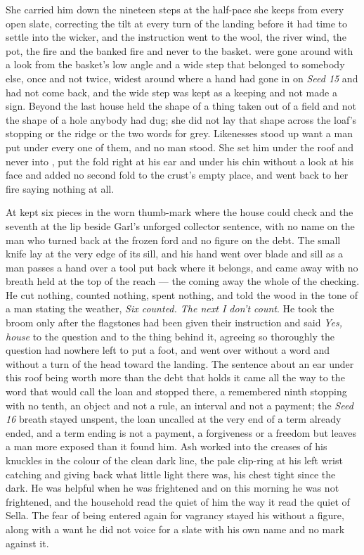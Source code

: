 She carried him down the nineteen steps at the half-pace she keeps from every open slate, correcting the tilt at every turn of the landing before it had time to settle into the wicker, and the instruction went to the wool, the river wind, the pot, the fire and the banked fire and never to the basket.  were gone around with a look from the basket's low angle and a wide step that belonged to somebody else, once and not twice, widest around  where a hand had gone in on \emph{Seed 15} and had not come back, and the wide step was kept as a keeping and not made a sign. Beyond the last house  held the shape of a thing taken out of a field and not the shape of a hole anybody had dug; she did not lay that shape across the loaf's stopping or the ridge or the two words for grey. Likenesses stood up want a man put under every one of them, and no man stood. She set him under the roof and never into , put the fold right at his ear and under his chin without a look at his face and added no second fold to the crust's empty place, and went back to her fire saying nothing at all.

At   kept six pieces in the worn thumb-mark where the house could check and the seventh at the lip beside Garl's unforged collector sentence, with no name on the man who turned back at the frozen ford and no figure on the debt. The small knife lay at the very edge of its sill, and his hand went over blade and sill as a man passes a hand over a tool put back where it belongs, and came away with no breath held at the top of the reach --- the coming away the whole of the checking. He cut nothing, counted nothing, spent nothing, and told the wood in the tone of a man stating the weather, \emph{Six counted. The next I don't count}. He took the broom only after the flagstones had been given their instruction and said \emph{Yes, house} to the question and to the thing behind it, agreeing so thoroughly the question had nowhere left to put a foot, and went over  without a word and without a turn of the head toward the landing. The sentence about an ear under this roof being worth more than the debt that holds it came all the way to the word that would call the loan and stopped there, a remembered ninth stopping with no tenth, an object and not a rule, an interval and not a payment; the \emph{Seed 16} breath stayed unspent, the loan uncalled at the very end of a term already ended, and a term ending is not a payment, a forgiveness or a freedom but leaves a man more exposed than it found him. Ash worked into the creases of his knuckles in the colour of the clean dark line, the pale clip-ring at his left wrist catching and giving back what little light there was, his chest tight since the dark. He was helpful when he was frightened and on this morning he was not frightened, and the household read the quiet of him the way it read the quiet of Sella. The fear of being entered again for vagrancy stayed his without a figure, along with a want he did not voice for a slate with his own name and no mark against it.

